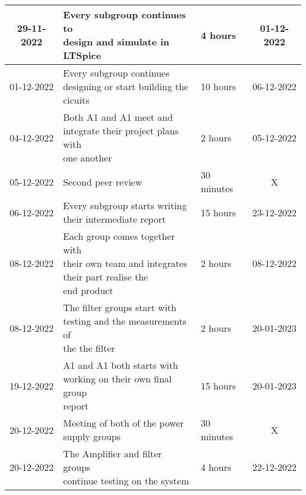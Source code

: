 \newpage
\clearpage

\begin{table}[ht!]
    \setlength{\arrayrulewidth}{0.5mm}
    \setlength{\tabcolsep}{16pt}
    \renewcommand{\arraystretch}{1.5}
    \centering
    \begin{tabular}{|c|l|l|c|}
         \hline
         29-11-2022 & \makecell[l]{Every subgroup continues to \\ design and simulate in LTSpice} & 4 hours & 01-12-2022 \\
         \hline
         01-12-2022 & \makecell[l]{Every subgroup continues \\ designing or start building the \\ cicuits} & 10 hours & 06-12-2022 \\
         \hline
         04-12-2022 & \makecell[l]{Both A1\textunderscore1 and A1\textunderscore2 meet and \\ integrate their project plans with \\ one another} & 2 hours & 05-12-2022 \\ 
         \hline
         05-12-2022 & Second peer review & 30 minutes & X \\
         \hline
         06-12-2022 & \makecell[l]{Every subgroup starts writing \\ their intermediate report} & 15 hours & 23-12-2022 \\
         \hline
         08-12-2022 & \makecell[l]{Each group comes together with \\ their own team and integrates \\  their part realise the \\ end product} & 2 hours & 08-12-2022 \\
         \hline
         08-12-2022 & \makecell[l]{The filter groups start with \\ testing and the  measurements of \\ the the filter} & 2 hours & 20-01-2023 \\
         \hline
         19-12-2022 & \makecell[l]{A1\textunderscore1 and A1\textunderscore2 both starts with \\ working on their own final group \\ report} & 15 hours & 20-01-2023 \\
         \hline
         20-12-2022 & \makecell[l]{Meeting of both of the power \\ supply groups} & 30 minutes & X \\
         \hline
         20-12-2022 & \makecell[l]{The Amplifier and filter groups \\ continue testing on the system} & 4 hours & 22-12-2022 \\

\end{tabular}
\end{table}
